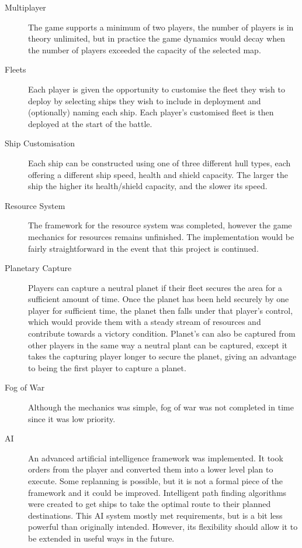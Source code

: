 \begin{description}

  \item[Multiplayer] The game supports a minimum of two players, the number of players is in theory unlimited, but in practice the game dynamics would decay when the number of players exceeded the capacity of the selected map.

  \item[Fleets] Each player is given the opportunity to customise the fleet they wish to deploy by selecting ships they wish to include in deployment and (optionally) naming each ship. Each player's customised fleet is then deployed at the start of the battle.

  \item[Ship Customisation] Each ship can be constructed using one of three different hull types, each offering a different ship speed, health and shield capacity. The larger the ship the higher its health/shield capacity, and the slower its speed.

  \item[Resource System] The framework for the resource system was completed, however the game mechanics for resources remains unfinished. The implementation 
would be fairly straightforward in the event that this project is continued.

  \item[Planetary Capture] Players can capture a neutral planet if their fleet secures the area for a sufficient amount of time. Once the planet has been held securely by one player for sufficient time, the planet then falls under that player's control, which would provide them with a steady stream of resources and contribute towards a victory condition. Planet's can also be captured from other players in the same way a neutral plant can be captured, except it takes the capturing player longer to secure the planet, giving an advantage to being the first player to capture a planet.

  \item[Fog of War] Although the mechanics was simple, fog of war was not completed in time since it was low priority. 

  \item[AI] An advanced artificial intelligence framework was implemented. It took orders from the player and converted them into a lower level plan to execute. Some replanning is possible, but it is not a formal piece of the framework and it could be improved. Intelligent path finding algorithms were created to get ships to take the optimal route to their planned destinations. This AI system mostly met requirements, but is a bit less powerful than originally intended. However, its flexibility should allow it to be extended in useful ways in the future.


\end{description}
